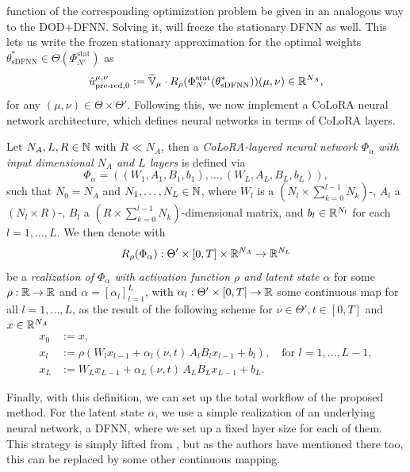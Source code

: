 function of the corresponding optimization problem be given in an analogous way to the DOD+DFNN.
Solving it, will freeze the stationary DFNN as well. This lets us write the frozen stationary approximation
for the optimal 
weights $\theta^*_\text{sDFNN} \in \Theta(\Phi^\text{stat}_{N'})$ as
\begin{equation*}
    \hat{u}_{\text{pre-red}, 0}^{\mu, \nu} := \widetilde{\mathbb{V}}_{\mu} \cdot 
    R_\rho(\Phi^\text{stat}_{N'}(\theta^*_\text{sDFNN}))(\mu, \nu) \in \mathbb{R}^{N_A},
\end{equation*}
for any $(\mu, \nu) \in \Theta \times \Theta'$.
Following this, we now implement a CoLoRA neural network architecture, which defines
neural networks in terms of CoLoRA layers.
\begin{definition}
    Let $N_A, L, R \in \mathbb{N}$ with $R \ll N_A$, then a \emph{CoLoRA-layered neural network $\Phi_\alpha$ 
    with input dimensional $N_A$ and $L$ layers} is
    defined via 
    \begin{equation*}
        \Phi_\alpha = ((W_1, A_1, B_1, b_1), \dots, (W_L, A_L, B_L, b_L)),
    \end{equation*}
    such that $N_0 = N_A$ and $N_1, \dots, N_L \in \mathbb{N}$, where $W_l$ is a $(N_l \times \sum_{k=0}^{l-1} N_k)$-, 
    $A_l$ a $(N_l \times R)$-, $B_l$ a $(R \times \sum_{k=0}^{l-1} N_k)$-dimensional matrix, and $b_l \in \mathbb{R}^{N_l}$ for
    each $l = 1, \dots, L$.
    We then denote with
    \begin{equation*}
        R_\rho(\Phi_\alpha): \Theta' \times [0, T] \times \mathbb{R}^{N_A} \to \mathbb{R}^{N_L}
    \end{equation*}
    be a \emph{realization of $\Phi_\alpha$ with activation
    function $\rho$ and latent state $\alpha$} for some $\rho: \mathbb{R} \to \mathbb{R}$ and $\alpha = [\alpha_l]_{l=1}^L$,
    with $\alpha_l: \Theta' \times [0, T] \to \mathbb{R}$ some continuous map for all $l=1, \dots, L$,
    as the result of the following scheme for $\nu \in \Theta', t \in [0, T]$ and $x \in \mathbb{R}^{N_A}$
    \begin{align*}
        x_0 &:= x, \\
        x_l &:= \rho \left( W_l x_{l-1} + \alpha_l(\nu, t)\, A_l B_l x_{l-1} + b_l \right), \quad \mbox{for } l = 1, \dots, L-1, \\
        x_L &:= W_L x_{L-1} + \alpha_L(\nu, t)\, A_L B_L x_{L-1} + b_L.
    \end{align*}
\end{definition}
Finally, with this definition, we can set up the total workflow of the proposed method.
For the latent state $\alpha$, we use a simple realization of an underlying neural network, a DFNN, 
where we set up a fixed layer size for each of them. This strategy is simply lifted from \cite{berman2024},
but as the authors have mentioned there too, this can be replaced by some other continuous mapping.

